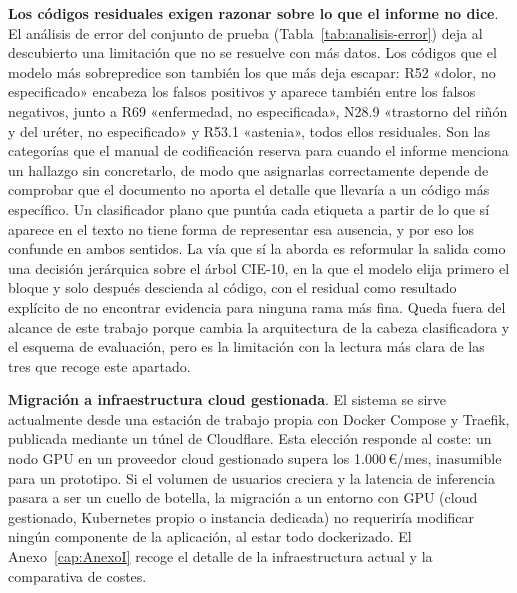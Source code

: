 \textbf{Los códigos residuales exigen razonar sobre lo que el informe no dice}. El análisis de error del conjunto de prueba (Tabla~\ref{tab:analisis-error}) deja al descubierto una limitación que no se resuelve con más datos. Los códigos que el modelo más sobrepredice son también los que más deja escapar: R52 «dolor, no especificado» encabeza los falsos positivos y aparece también entre los falsos negativos, junto a R69 «enfermedad, no especificada», N28.9 «trastorno del riñón y del uréter, no especificado» y R53.1 «astenia», todos ellos residuales. Son las categorías que el manual de codificación reserva para cuando el informe menciona un hallazgo sin concretarlo, de modo que asignarlas correctamente depende de comprobar que el documento no aporta el detalle que llevaría a un código más específico. Un clasificador plano que puntúa cada etiqueta a partir de lo que sí aparece en el texto no tiene forma de representar esa ausencia, y por eso los confunde en ambos sentidos. La vía que sí la aborda es reformular la salida como una decisión jerárquica sobre el árbol CIE-10, en la que el modelo elija primero el bloque y solo después descienda al código, con el residual como resultado explícito de no encontrar evidencia para ninguna rama más fina. Queda fuera del alcance de este trabajo porque cambia la arquitectura de la cabeza clasificadora y el esquema de evaluación, pero es la limitación con la lectura más clara de las tres que recoge este apartado.

\textbf{Migración a infraestructura cloud gestionada}. El sistema se sirve actualmente desde una estación de trabajo propia con Docker Compose y Traefik, publicada mediante un túnel de Cloudflare. Esta elección responde al coste: un nodo GPU en un proveedor cloud gestionado supera los 1.000\,€/mes, inasumible para un prototipo. Si el volumen de usuarios creciera y la latencia de inferencia pasara a ser un cuello de botella, la migración a un entorno con GPU (cloud gestionado, Kubernetes propio o instancia dedicada) no requeriría modificar ningún componente de la aplicación, al estar todo dockerizado. El Anexo~\ref{cap:AnexoI} recoge el detalle de la infraestructura actual y la comparativa de costes.

